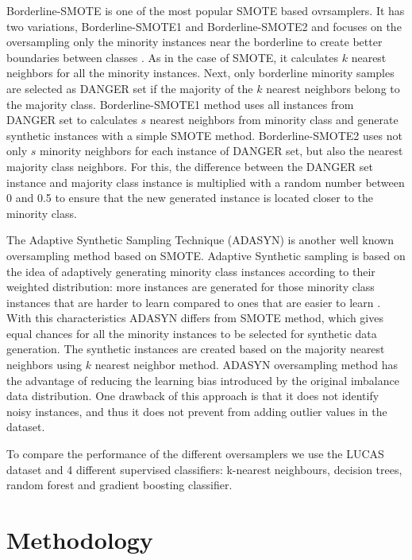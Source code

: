 \documentclass[parskip=full]{scrartcl}
\begin{document}
Borderline-SMOTE is one of the most popular SMOTE based ovrsamplers. It has two 
variations, Borderline-SMOTE1 and Borderline-SMOTE2 and focuses on the 
oversampling only the minority instances near the borderline to create better 
boundaries between classes \cite{Han2005}. As in the case of SMOTE, it 
calculates $k$ nearest neighbors for all the minority instances. Next, only 
borderline minority samples are selected as DANGER set if the majority of the 
$k$ nearest neighbors belong to the majority class. Borderline-SMOTE1 method 
uses all instances from DANGER set to calculates $s$ nearest neighbors from 
minority class and generate synthetic instances with a simple SMOTE method. 
Borderline-SMOTE2 uses not only $s$ minority neighbors for each instance of 
DANGER set, but also the nearest majority class neighbors. For this, the 
difference between the DANGER set instance and majority class instance is 
multiplied with a random number between 0 and 0.5 to ensure that the new 
generated instance is located closer to the minority class. 

The Adaptive Synthetic Sampling Technique (ADASYN) is another well known 
oversampling method based on SMOTE. Adaptive Synthetic sampling is based on the 
idea of adaptively generating minority class instances according to their 
weighted distribution: more instances are generated for those minority class 
instances that are harder to learn compared to ones that are easier to learn 
\cite{HaiboHe2008}. With this characteristics ADASYN differs from SMOTE method, 
which gives equal chances for all the minority instances to be selected for 
synthetic data generation. The synthetic instances are created based on the 
majority nearest neighbors using $k$ nearest neighbor method. ADASYN 
oversampling method has the advantage of reducing the learning bias introduced 
by the original imbalance data distribution. One drawback of this approach is 
that it does not identify noisy instances, and thus it does not prevent from 
adding outlier values in the dataset.

To compare the performance of the different oversamplers we use the LUCAS 
dataset and 4 different supervised classifiers: k-nearest neighbours, decision 
trees, random forest and gradient boosting classifier. 

\section{Methodology}
\end{document}
